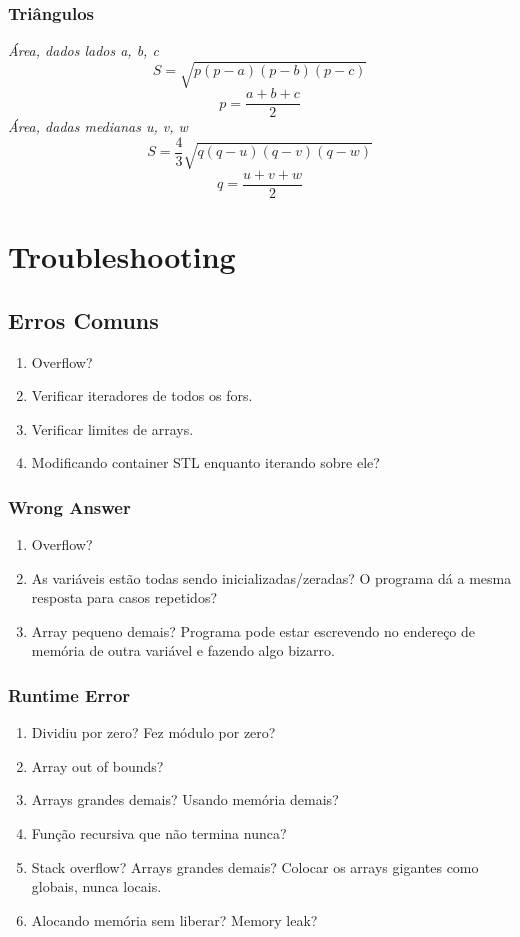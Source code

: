 \documentclass[12pt,a4paper]{article}
\begin{document}
			\subsubsection{Triângulos}
				\emph{Área, dados lados a, b, c}
				\[ S = \sqrt{p (p - a) (p - b) (p - c)} \]
				\[ p = \frac{a + b + c}{2} \]
				\emph{Área, dadas medianas u, v, w}
				\[ S = \frac{4}{3} \sqrt{q (q - u) (q - v) (q - w)} \]
				\[ q = \frac{u + v + w}{2} \]

	\onecolumn
	\section{Troubleshooting}
		\subsection{Erros Comuns}
			\begin{enumerate}
				\item Overflow?
				\item Verificar iteradores de todos os fors.
				\item Verificar limites de arrays.
				\item Modificando container STL enquanto iterando sobre ele?
			\end{enumerate}
			\subsubsection{Wrong Answer}
				\begin{enumerate}
					\item Overflow?
					\item As variáveis estão todas sendo inicializadas/zeradas? O programa dá a mesma resposta para casos repetidos?
					\item Array pequeno demais? Programa pode estar escrevendo no endereço de memória de outra variável e fazendo algo bizarro.
				\end{enumerate}
			\subsubsection{Runtime Error}
				\begin{enumerate}
					\item Dividiu por zero? Fez módulo por zero?
					\item Array out of bounds?
					\item Arrays grandes demais? Usando memória demais?
					\item Função recursiva que não termina nunca?
					\item Stack overflow? Arrays grandes demais? Colocar os arrays gigantes como globais, nunca locais.
					\item Alocando memória sem liberar? Memory leak?
				\end{enumerate}
\end{document}
